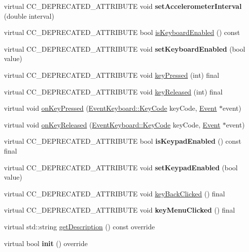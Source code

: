\begin{DoxyCompactItemize}
virtual C\+C\+\_\+\+D\+E\+P\+R\+E\+C\+A\+T\+E\+D\+\_\+\+A\+T\+T\+R\+I\+B\+U\+TE void {\bfseries set\+Accelerometer\+Interval} (double interval)
\item 
virtual C\+C\+\_\+\+D\+E\+P\+R\+E\+C\+A\+T\+E\+D\+\_\+\+A\+T\+T\+R\+I\+B\+U\+TE bool \hyperlink{classLayer_a762e193aa1b2515510a16ff621a81662}{is\+Keyboard\+Enabled} () const
\item 
\mbox{\label{classLayer_a802a1405ce43b326f4fbd25d51f04899}} 
virtual C\+C\+\_\+\+D\+E\+P\+R\+E\+C\+A\+T\+E\+D\+\_\+\+A\+T\+T\+R\+I\+B\+U\+TE void {\bfseries set\+Keyboard\+Enabled} (bool value)
\item 
virtual C\+C\+\_\+\+D\+E\+P\+R\+E\+C\+A\+T\+E\+D\+\_\+\+A\+T\+T\+R\+I\+B\+U\+TE void \hyperlink{classLayer_aff1ce0d6398816823cabb880461da415}{key\+Pressed} (int) final
\item 
virtual C\+C\+\_\+\+D\+E\+P\+R\+E\+C\+A\+T\+E\+D\+\_\+\+A\+T\+T\+R\+I\+B\+U\+TE void \hyperlink{classLayer_ad7e6ea710a36e46dace8acb93eee10f9}{key\+Released} (int) final
\item 
virtual void \hyperlink{classLayer_ab45df2e3f40c128c11da1a92826ceef1}{on\+Key\+Pressed} (\hyperlink{classEventKeyboard_a7cd3fa46515673276ce8ec7f0e051606}{Event\+Keyboard\+::\+Key\+Code} key\+Code, \hyperlink{classEvent}{Event} $\ast$event)
\item 
virtual void \hyperlink{classLayer_a2b6862d65f1d0d318b1340394ddade96}{on\+Key\+Released} (\hyperlink{classEventKeyboard_a7cd3fa46515673276ce8ec7f0e051606}{Event\+Keyboard\+::\+Key\+Code} key\+Code, \hyperlink{classEvent}{Event} $\ast$event)
\item 
\mbox{\label{classLayer_a3739dde26584085e331444f4da5ef60b}} 
virtual C\+C\+\_\+\+D\+E\+P\+R\+E\+C\+A\+T\+E\+D\+\_\+\+A\+T\+T\+R\+I\+B\+U\+TE bool {\bfseries is\+Keypad\+Enabled} () const final
\item 
\mbox{\label{classLayer_a6e0153ac9b0f0e985121ab4d1abb911a}} 
virtual C\+C\+\_\+\+D\+E\+P\+R\+E\+C\+A\+T\+E\+D\+\_\+\+A\+T\+T\+R\+I\+B\+U\+TE void {\bfseries set\+Keypad\+Enabled} (bool value)
\item 
virtual C\+C\+\_\+\+D\+E\+P\+R\+E\+C\+A\+T\+E\+D\+\_\+\+A\+T\+T\+R\+I\+B\+U\+TE void \hyperlink{classLayer_aea2ec8f77681b4fd1c988bbeeb3d1c22}{key\+Back\+Clicked} () final
\item 
\mbox{\label{classLayer_a42d14eb2fd8bd090562f9144e5a770bc}} 
virtual C\+C\+\_\+\+D\+E\+P\+R\+E\+C\+A\+T\+E\+D\+\_\+\+A\+T\+T\+R\+I\+B\+U\+TE void {\bfseries key\+Menu\+Clicked} () final
\item 
virtual std\+::string \hyperlink{classLayer_ac35b850bd512fae372643e3217083260}{get\+Description} () const override
\item 
\mbox{\label{classLayer_a29b9bae6fe8a6f135907536a19405d17}} 
virtual bool {\bfseries init} () override
\end{DoxyCompactItemize}
